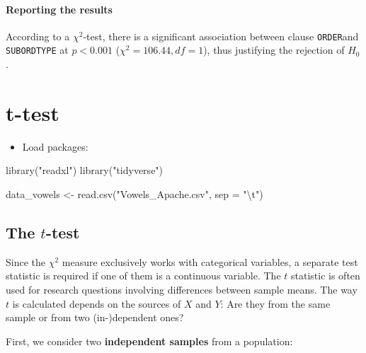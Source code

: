 \documentclass[
  11pt,
  letterpaper,
  DIV=11,
  numbers=noendperiod]{scrreprt}
\newenvironment{Shaded}{\begin{snugshade}}{\end{snugshade}}
\newcommand{\AttributeTok}[1]{\textcolor[rgb]{0.40,0.45,0.13}{#1}}
\newcommand{\FunctionTok}[1]{\textcolor[rgb]{0.28,0.35,0.67}{#1}}
\newcommand{\NormalTok}[1]{\textcolor[rgb]{0.00,0.23,0.31}{#1}}
\newcommand{\OtherTok}[1]{\textcolor[rgb]{0.00,0.23,0.31}{#1}}
\newcommand{\SpecialCharTok}[1]{\textcolor[rgb]{0.37,0.37,0.37}{#1}}
\newcommand{\StringTok}[1]{\textcolor[rgb]{0.13,0.47,0.30}{#1}}
\providecommand{\tightlist}{%
  \setlength{\itemsep}{0pt}\setlength{\parskip}{0pt}}\usepackage{longtable,booktabs,array}
\begin{document}
\subsubsection{Reporting the results}\label{reporting-the-results}

According to a \(\chi^2\)-test, there is a significant association
between clause \texttt{ORDER}and \texttt{SUBORDTYPE} at \(p < 0.001\)
(\(\chi^2 = 106.44, df = 1\)), thus justifying the rejection of \(H_0\).

\chapter{t-test}\label{t-test}

\begin{itemize}
\tightlist
\item
  Load packages:
\end{itemize}

\begin{Shaded}
\begin{Highlighting}[]
\FunctionTok{library}\NormalTok{(}\StringTok{"readxl"}\NormalTok{)}
\FunctionTok{library}\NormalTok{(}\StringTok{"tidyverse"}\NormalTok{)}
\end{Highlighting}
\end{Shaded}

\begin{Shaded}
\begin{Highlighting}[]
\NormalTok{data\_vowels }\OtherTok{\textless{}{-}} \FunctionTok{read.csv}\NormalTok{(}\StringTok{"Vowels\_Apache.csv"}\NormalTok{, }\AttributeTok{sep =} \StringTok{"}\SpecialCharTok{\textbackslash{}t}\StringTok{"}\NormalTok{)}
\end{Highlighting}
\end{Shaded}

\section{\texorpdfstring{The \(t\)-test}{The t-test}}\label{the-t-test}

Since the \(\chi^2\) measure exclusively works with categorical
variables, a separate test statistic is required if one of them is a
continuous variable. The \(t\) statistic is often used for research
questions involving differences between sample means. The way \(t\) is
calculated depends on the sources of \(X\) and \(Y\): Are they from the
same sample or from two (in-)dependent ones?

First, we consider two \textbf{independent samples} from a population:
\end{document}
